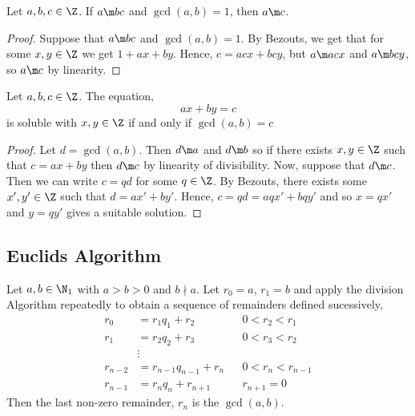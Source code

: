 \begin{nlemma}
  Let $a, b, c \in \Z$. If $a \m bc$ and $\gcd(a, b) = 1$, then $a \m c$.
\end{nlemma}

\begin{proof}
  Suppose that $a \m bc$ and $\gcd(a, b) = 1$. By Bezouts, we get that for some $x, y \in \Z$ we get $1 + ax + by$. Hence, $c = acx + bcy$, but $a \m acx$ and $a \m bcy$, so $a \m c$ by linearity.
\end{proof}

\begin{nthm}
  Let $a, b, c \in \Z$. The equation,
  $$ ax + by = c $$
  is soluble with $x, y \in \Z$ if and only if $\gcd(a, b) = c$
\end{nthm}

\begin{proof}
  Let $d = \gcd(a, b)$. Then $d \m a$ and $d \m b$ so if there exists $x, y \in \Z$ such that $c = ax + by$ then $d \m c$ by linearity of divisibility. Now, suppose that $d \m c$. Then we can write $c = qd$ for some $q \in \Z$. By Bezouts, there exists some $x', y' \in \Z$ such that $d = ax' + by'$. Hence, $c = qd = aqx' + bqy'$ and so $x = qx'$ and $y = qy'$ gives a suitable solution.
\end{proof}

\subsection{Euclids Algorithm}

\begin{nthm}
  Let $a, b \in \N_1$ with $a > b > 0$ and $b \nmid a$. Let $r_0 = a$, $r_1 = b$ and apply the division Algorithm repeatedly to obtain a sequence of remainders defined sucessively,
  \begin{align*}
    r_0 &= r_1q_1 + r_2 && 0 < r_2 < r_1\\
    r_1 &= r_2q_2 + r_3 && 0 < r_3 < r_2\\
    &\vdots\\
    r_{n-2} &= r_{n-1}q_{n-1} + r_n && 0 < r_{n} < r_{n-1}\\
    r_{n-1} &= r_nq_n + r_{n+1} && r_{n+1}=0
  \end{align*}
  Then the last non-zero remainder, $r_n$ is the $\gcd(a, b)$.
\end{nthm}

